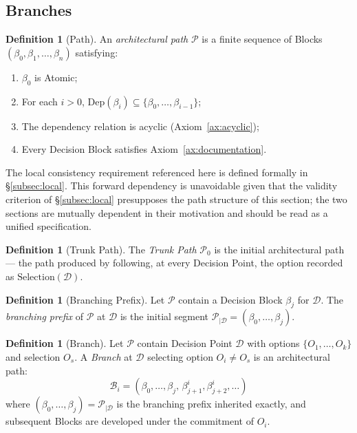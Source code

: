 \documentclass[12pt, a4paper]{article}
\theoremstyle{plain}
\theoremstyle{definition}
\newtheorem{definition}[theorem]{Definition}
\theoremstyle{remark}
\begin{document}
\subsection{Branches}
\label{subsec:branches}

\begin{definition}[Path]
\label{def:path}
An \emph{architectural path} $\mathcal{P}$ is a finite sequence
of Blocks $(\beta_0, \beta_1, \ldots, \beta_n)$ satisfying:
\begin{enumerate}
  \item $\beta_0$ is Atomic;
  \item For each $i > 0$, $\mathrm{Dep}(\beta_i) \subseteq
        \{\beta_0, \ldots, \beta_{i-1}\}$;
  \item The dependency relation is acyclic
        (Axiom~\ref{ax:acyclic});
  \item Every Decision Block satisfies
        Axiom~\ref{ax:documentation}.
\end{enumerate}
The local consistency requirement referenced here is defined
formally in \S\ref{subsec:local}. This forward dependency is
unavoidable given that the validity criterion of
\S\ref{subsec:local} presupposes the path structure of this
section; the two sections are mutually dependent in their
motivation and should be read as a unified specification.
\end{definition}

\begin{definition}[Trunk Path]
\label{def:trunk}
The \emph{Trunk Path} $\mathcal{P}_0$ is the initial
architectural path --- the path produced by following, at every
Decision Point, the option recorded as
$\mathrm{Selection}(\mathcal{D})$.
\end{definition}

\begin{definition}[Branching Prefix]
\label{def:prefix}
Let $\mathcal{P}$ contain a Decision Block $\beta_j$ for
$\mathcal{D}$. The \emph{branching prefix} of $\mathcal{P}$ at
$\mathcal{D}$ is the initial segment
$\mathcal{P}_{|\mathcal{D}} = (\beta_0, \ldots, \beta_j)$.
\end{definition}

\begin{definition}[Branch]
\label{def:branch}
Let $\mathcal{P}$ contain Decision Point $\mathcal{D}$ with
options $\{O_1,\ldots,O_k\}$ and selection $O_s$. A
\emph{Branch} at $\mathcal{D}$ selecting option $O_i \neq O_s$
is an architectural path:
\[
  \mathcal{B}_i
  = (\beta_0, \ldots, \beta_j,\,
     \beta^i_{j+1}, \beta^i_{j+2}, \ldots)
\]
where $(\beta_0,\ldots,\beta_j) = \mathcal{P}_{|\mathcal{D}}$
is the branching prefix inherited exactly, and subsequent Blocks
are developed under the commitment of $O_i$.
\end{definition}
\end{document}
